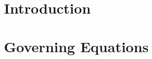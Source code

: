 \documentclass[
10pt, %
a4paper, %
oneside, %
headinclude,footinclude, %
table
]{scrartcl}
\begin{document}


\setlength\parindent{10pt} %
\setlength{\parskip}{5pt} %


\section{Introduction}

\section{Governing Equations}
\end{document}
